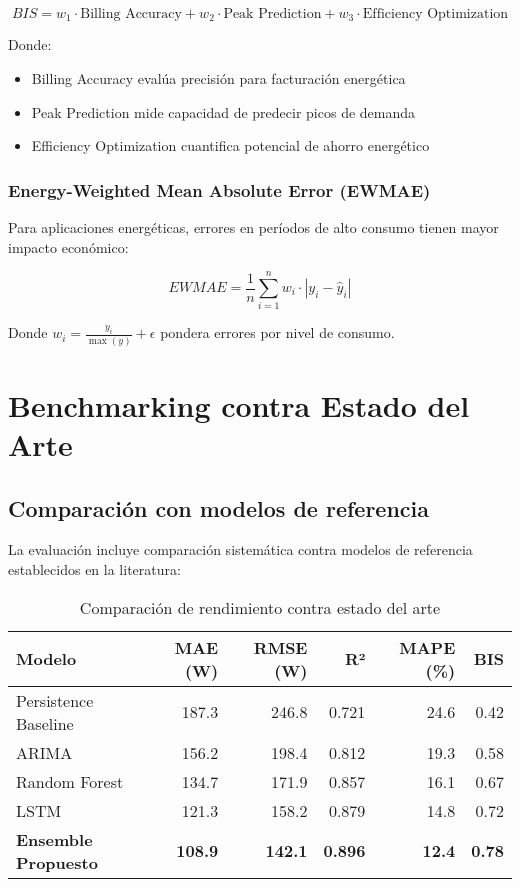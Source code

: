 \begin{equation}
BIS = w_1 \cdot \text{Billing Accuracy} + w_2 \cdot \text{Peak Prediction} + w_3 \cdot \text{Efficiency Optimization}
\end{equation}

Donde:
\begin{itemize}
\item Billing Accuracy evalúa precisión para facturación energética
\item Peak Prediction mide capacidad de predecir picos de demanda
\item Efficiency Optimization cuantifica potencial de ahorro energético
\end{itemize}

\subsubsection{Energy-Weighted Mean Absolute Error (EWMAE)}

Para aplicaciones energéticas, errores en períodos de alto consumo tienen mayor impacto económico:

\begin{equation}
EWMAE = \frac{1}{n} \sum_{i=1}^{n} w_i \cdot |y_i - \hat{y}_i|
\end{equation}

Donde $w_i = \frac{y_i}{\max(y)} + \epsilon$ pondera errores por nivel de consumo.

\section{Benchmarking contra Estado del Arte}

\subsection{Comparación con modelos de referencia}

La evaluación incluye comparación sistemática contra modelos de referencia establecidos en la literatura:

\begin{table}[H]
\centering
\caption{Comparación de rendimiento contra estado del arte}
\begin{tabular}{lrrrrr}
\toprule
\textbf{Modelo} & \textbf{MAE (W)} & \textbf{RMSE (W)} & \textbf{R²} & \textbf{MAPE (\%)} & \textbf{BIS} \\
\midrule
Persistence Baseline & 187.3 & 246.8 & 0.721 & 24.6 & 0.42 \\
ARIMA & 156.2 & 198.4 & 0.812 & 19.3 & 0.58 \\
Random Forest & 134.7 & 171.9 & 0.857 & 16.1 & 0.67 \\
LSTM & 121.3 & 158.2 & 0.879 & 14.8 & 0.72 \\
\textbf{Ensemble Propuesto} & \textbf{108.9} & \textbf{142.1} & \textbf{0.896} & \textbf{12.4} & \textbf{0.78} \\
\bottomrule
\end{tabular}
\label{tab:benchmark_comparison}
\end{table}

